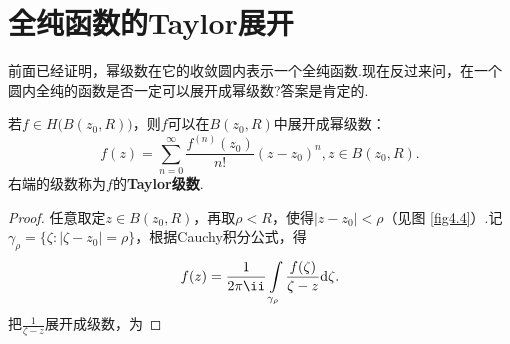
\section{全纯函数的Taylor展开\label{sec4.3}}
前面已经证明，幂级数在它的收敛圆内表示一个全纯函数.现在反过来问，在一个圆内全纯的函数是否一定可以展开成幂级数?答案是肯定的.
\begin{theorem}\label{thm4.3.1}
若$f\in H\big(B(z_0,R)\big)$，则$f$可以在$B(z_0,R)$中展开成幂级数：
\begin{equation}\label{eq4.3.1}
f(z)=\sum_{n=0}^\infty \frac{f^{(n)}(z_0)}{n!}(z-z_0)^n,z\in B(z_0,R).
\end{equation}
右端的级数称为$f$的\textbf{Taylor级数}.
\end{theorem}
\begin{proof}
任意取定$z\in B(z_0,R)$，再取$\rho<R$，使得$|z-z_0|<\rho$（见图 \ref{fig4.4}）.记$\gamma_\rho=\{\zeta:|\zeta-z_0|=\rho\}$，根据Cauchy积分公式，得
\[f(z)=\frac1{2\pi\ii}\int\limits_{\gamma_\rho}\frac{f(\zeta)}{\zeta-z}\textrm d\zeta.\]
把$\frac1{\zeta-z}$展开成级数，为


\end{proof}

